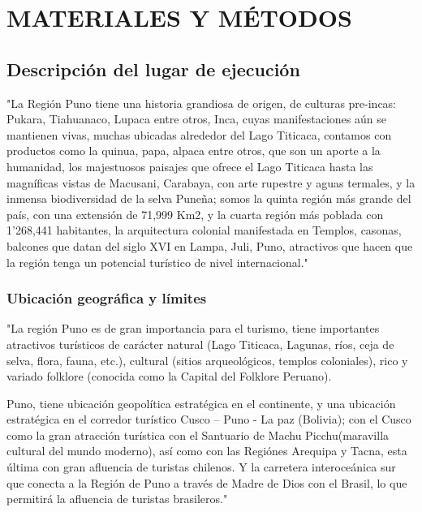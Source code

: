 \chapter{MATERIALES Y MÉTODOS}
\section{Descripción del lugar de ejecución}
"La Región Puno tiene una historia grandiosa de origen, de culturas pre-incas: Pukara, Tiahuanaco, Lupaca entre otros, Inca, cuyas manifestaciones aún se mantienen vivas, muchas ubicadas alrededor del Lago Titicaca, contamos con productos como la quinua, papa, alpaca entre otros, que son un aporte a la humanidad, los majestuosos paisajes que ofrece el Lago Titicaca hasta las magníficas vistas de Macusani, Carabaya, con arte rupestre y aguas termales, y la inmensa biodiversidad de la selva Puneña; somos la quinta región más grande del país, con una extensión de 71,999 Km2, y la cuarta región más poblada con 1’268,441 habitantes, la arquitectura colonial manifestada en Templos, casonas, balcones que datan del siglo XVI en Lampa, Juli, Puno, atractivos que hacen que la región tenga un potencial turístico de nivel internacional." \cite{2011PlanPERTUR}

\subsection{Ubicación geográfica y límites}
"La región Puno es de gran importancia para el turismo, tiene importantes atractivos turísticos de carácter natural (Lago Titicaca, Lagunas, ríos, ceja de selva, flora, fauna, etc.), cultural (sitios arqueológicos, templos coloniales), rico y variado folklore (conocida como la Capital del Folklore Peruano).

Puno, tiene ubicación geopolítica estratégica en el continente, y una ubicación estratégica en el corredor turístico Cusco – Puno - La paz (Bolivia); con el Cusco como la gran atracción turística con el Santuario de Machu Picchu(maravilla cultural del mundo moderno), así como con las Regiónes Arequipa y Tacna, esta última con gran afluencia de turistas chilenos. Y la carretera interoceánica sur que conecta a la Región de Puno a través de Madre de Dios con el Brasil, lo que permitirá la afluencia de turistas brasileros." \cite{2011PlanPERTUR}

